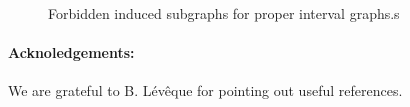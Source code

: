 \documentclass{endm}
\begin{document}
\begin{figure}[h!]
	\begin{center}
\quad
		\subfigure[][3-Sun]{\texttt{[image: S3]}}	
\quad
	\caption{Forbidden induced subgraphs for proper interval graphs.s}
	\label{fig:ForbiddenProperIntervalGraph}
	\end{center}
\end{figure}


\paragraph{Acknoledgements:}
We are grateful to B. L\'{e}v\^{e}que for pointing out useful references.

 

\end{document}
